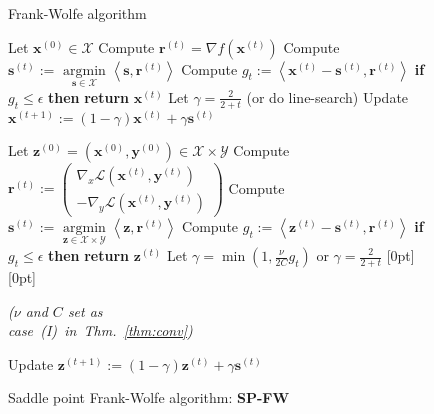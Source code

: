 \documentclass[twoside]{article}
\renewcommand{\L}{\mathcal{L}}
\newcommand{\X}{\mathcal{X}}
\newcommand{\Y}{\mathcal{Y}}
\newcommand{\M}{\X \times \Y}
\newcommand{\x}{\bm{x}}
\newcommand{\y}{\bm{y}}
\newcommand{\z}{\bm{z}}
\newcommand{\s}{\bm{s}}
\newcommand{\xt}{\bm{x}^{(t)}}
\newcommand{\xtt}{\bm {x}^{(t+1)}}
\newcommand{\zt}{\bm{z}^{(t)}}
\newcommand{\ztt}{\bm {z}^{(t+1)}}
\newcommand{\st}{\bm{s}^{(t)}}
\newcommand{\rt}{\r^{(t)}}
\newcommand{\yt}{\bm{y}^{(t)}}
\newcommand{\gap}{g_{t}}
\newcommand{\CondNumb}{\nu}
\renewcommand{\r}{\bm{r}}
\newcommand{\innerProd}[2]{\left\langle #1 , #2 \right\rangle}
\newcommand{\0}{\mathbf{0}} %
\begin{document}
\begingroup
\setlength{\intextsep}{-1.5mm}
\setlength{\floatsep}{-1.5mm}
\setlength{\textfloatsep}{-1.5mm}
\setlength{\intextsep}{-1.5mm}
\begin{figure*}[t]
\begin{minipage}[t]{.45\textwidth}
  \begin{algorithm}[H]
    \caption{Frank-Wolfe algorithm}\label{FW}
    \begin{algorithmic}[1]
      \STATE Let $\x^{(0)} \in \X$
      \vspace*{.4mm}
      \STATE Compute $\rt = \nabla f(\x^{(t)})$
      \vspace*{.85mm}
      \STATE Compute $\st := \underset{\s \in \X}{\text{ argmin }} \innerProd{\s}{\rt}$
      \vspace*{.45mm}
      \STATE Compute $g_t := \left\langle \xt-\st, \rt\right\rangle$
      \vspace*{.85mm}
      \STATE \textbf{if} $ \gap \leq \epsilon$ \textbf{then} \textbf{return} $\x^{(t)}$ 
      \vspace*{.85mm}
      \STATE Let $\gamma = \frac{2}{2+t}$ (or do line-search)
      \vspace*{.85mm}
      \STATE Update $\xtt := (1- \gamma) \xt + \gamma \st$
      \ENDFOR
    \end{algorithmic}
  \end{algorithm}
\end{minipage}
\hspace{-2mm}
\begin{minipage}[t]{.55\textwidth}
\begin{algorithm}[H]
  \caption{Saddle point Frank-Wolfe algorithm: \textbf{SP-FW}}\label{alg:SP-FW}
  \begin{algorithmic}[1]
      \STATE Let $\z^{(0)} =(\x^{(0)},\y^{(0)}) \in \M$
      \STATE Compute $ \rt := \begin{pmatrix} 
                  \nabla_x \L(\xt,\yt) \\
                  -\nabla_y \L(\xt,\yt)\end{pmatrix}$ \label{algLine:rk}
      \STATE Compute $\st := \underset{\z \in \X\times \Y}{\text{ argmin }} \innerProd{\z}{\rt}$
      \STATE Compute $g_t := \left\langle \zt-\st, \rt\right\rangle $
      \STATE \textbf{if} $ g_t\leq \epsilon$ \textbf{then} \textbf{return} $\z^{(t)}$
      \STATE Let $\gamma =  \min\left(1, \frac\CondNumb{2C}\gap\right) $ or $\gamma = \frac{2}{2+t}$ 
      \hfill \raisebox{0pt}[0pt][0pt]{
      		\begin{minipage}{2.5cm}
      			\emph{\small($\CondNumb$ and $C$ set as \\ case~(I)~in~Thm.~\ref{thm:conv})}
      		\end{minipage}
      		}
      \STATE Update $\ztt := (1- \gamma) \zt + \gamma \st$
      \ENDFOR
\end{algorithmic}
\end{algorithm}
\end{minipage}
%
%
\vspace{-3mm}
\end{figure*}
\end{document}
